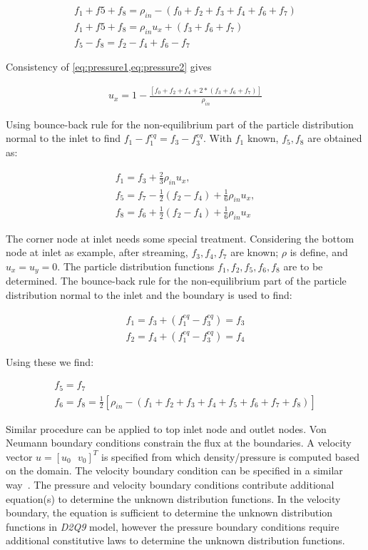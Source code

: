 \begin{gather}
f_1+f5+f_8 = \rho_{in} - (f_0+f_2+f_3+f_4+f_6+f_7) \label{eq:pressure1}\\
f_1+f5+f_8 = \rho_{in}u_x + (f_3+f_6+f_7) \label{eq:pressure2} \\
f_5 - f_8  = f_2 - f_4 +f_6 -f_7
\end{gather}

\noindent Consistency of \cref{eq:pressure1,eq:pressure2} gives

\begin{align}
u_x = 1 - \frac{[f_0+f_2+f_4+2*(f_3+f_6+f_7)]}{\rho_{in}}
\end{align}

Using bounce-back rule for the non-equilibrium part of the particle 
distribution normal to the inlet to find $f_1 -f_1^{eq} = f_3 -f_3^{eq}$. With 
$f_1$ known, $f_5,f_8$ are obtained as:

\begin{gather}
f_1 = f_3 + \frac{2}{3} \rho_{in}u_x, \nonumber \\ 
f_5 = f_7 - \frac{1}{2}(f_2 - f_4) + \frac{1}{6}\rho_{in}u_x,\nonumber \\ 
f_8 = f_6 + \frac{1}{2}(f_2 - f_4) + \frac{1}{6}\rho_{in}u_x
\end{gather}

The corner node at inlet needs some special treatment. Considering the bottom 
node at inlet as example, after streaming, $f_3, f_4, f_7$ are known; $\rho$ is 
define, and $u_x = u_y = 0$. The particle distribution functions $f_1, f_2, 
f_5, f_6, f_8$ are to be determined. The bounce-back rule for the 
non-equilibrium part of the particle distribution normal to the inlet and the 
boundary is used to find:

\begin{gather}
f_1 = f_3 + (f_1^{eq}-f_3^{eq}) = f_3 \\
f_2 = f_4 + (f_1^{eq}-f_3^{eq}) = f_4
\end{gather}

\noindent Using these we find: 

\begin{gather}
f_5 = f_7 \\
f_6 = f_8 = \frac{1}{2}[\rho_{in} - (f_1 + f_2 + f_3 + f_4 + f_5 + f_6 + f_7 + f_8)]
\end{gather}

Similar procedure can be applied to top inlet node and outlet nodes. Von 
Neumann boundary conditions constrain the flux at the boundaries. A velocity 
vector $u=\left[ u_0\mbox{ }v_0 \right]^T$ is specified from which 
density/pressure is computed based on the domain. The velocity boundary 
condition can be specified in a similar way~\citep{Zou1997}. The pressure and 
velocity boundary conditions contribute additional equation(s) to determine the 
unknown distribution functions. In the velocity boundary, the equation is 
sufficient to determine the unknown distribution functions in \textit{D2Q9} 
model, however the pressure boundary conditions require additional constitutive 
laws to determine the unknown distribution functions. 

